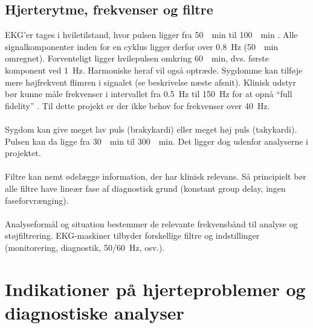 \documentclass[a4paper]{report}
\begin{document}
\begin{par}

\subsection{Hjerterytme, frekvenser og filtre}
EKG'er tages i hviletilstand, hvor pulsen ligger fra \SI{50}{\per\minute} til \SI{100}{\per\minute} \cite{absalonrytme}.
Alle signalkomponenter inden for en cyklus ligger derfor over \SI{0.8}{\hertz} (\SI{50}{\per\minute} omregnet).
Forventeligt ligger hvilepulsen omkring \SI{60}{\per\minute}, dvs. første komponent ved \SI{1}{\hertz}.
Harmoniske heraf vil også optræde.
Sygdomme kan tilføje mere højfrekvent flimren i signalet (se beskrivelse næste afsnit).
Klinisk udstyr bør kunne måle frekvenser i intervallet fra \SI{0.5}{\hertz} til \SI{150}{\hertz} for at opnå ``full fidelity'' \cite{emsfilter}.
Til dette projekt er der ikke behov for frekvenser over \SI{40}{\hertz}.
\\ \\
Sygdom kan give meget lav puls (brakykardi) eller meget høj puls (takykardi).
Pulsen kan da ligge fra \SI{30}{\per\minute} til \SI{300}{\per\minute}.
Det ligger dog udenfor analyserne i projektet.
\\ \\
Filtre kan nemt ødelægge information, der har klinisk relevans.
Så principielt bør alle filtre have lineær fase af diagnostisk grund (konstant group delay, ingen faseforvrænging).
\\ \\
Analyseformål og situation bestemmer de relevante frekvensbånd til analyse og støjfiltrering.
EKG-maskiner tilbyder forskellige filtre og indstillinger (monitorering, diagnostik, 50/\SI{60}{\hertz}, osv.).

\end{par} 



\section{Indikationer på hjerteproblemer og diagnostiske analyser}
\end{document}
